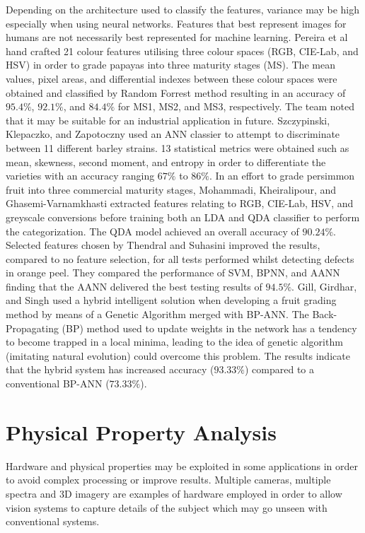 \documentclass[fleqn,twoside,12pt]{report}
\begin{document}
Depending on the architecture used to classify the features, variance may be high especially when using neural networks. Features that best represent images for humans are not necessarily best represented for machine learning. Pereira et al \cite{pereira} hand crafted 21 colour features utilising three colour spaces (RGB, CIE-Lab, and HSV) in order to grade papayas into three maturity stages (MS). The mean values, pixel areas, and differential indexes between these colour spaces were obtained and classified by Random Forrest method resulting in an accuracy of $95.4\%$, $92.1\%$, and $84.4\%$ for MS1, MS2, and MS3, respectively. The team noted that it may be suitable for an industrial application in future. Szczypinski, Klepaczko, and Zapotoczny \cite{szczypinski} used an ANN classier to attempt to discriminate between 11 different barley strains. 13 statistical metrics were obtained such as mean, skewness, second moment, and entropy in order to differentiate the varieties with an accuracy ranging $67\%$ to $86\%$. In an effort to grade persimmon fruit into three commercial maturity stages, Mohammadi, Kheiralipour, and Ghasemi-Varnamkhasti \cite{mohammadi} extracted features relating to RGB, CIE-Lab, HSV, and greyscale conversions before training both an LDA and QDA classifier to perform the categorization. The QDA model achieved an overall accuracy of $90.24\%$. Selected features chosen by Thendral and Suhasini \cite{thendral} improved the results, compared to no feature selection, for all tests performed whilst detecting defects in orange peel. They compared the performance of SVM, BPNN, and AANN finding that the AANN delivered the best testing results of $94.5\%$. Gill, Girdhar, and Singh \cite{gill} used a hybrid intelligent solution when developing a fruit grading method by means of a Genetic Algorithm merged with BP-ANN. The Back-Propagating (BP) method used to update weights in the network has a tendency to become trapped in a local minima, leading to the idea of genetic algorithm (imitating natural evolution) could overcome this problem. The results indicate that the hybrid system has increased accuracy ($93.33\%$) compared to a conventional BP-ANN ($73.33\%$).  



\section{Physical Property Analysis}

Hardware and physical properties may be exploited in some applications in order to avoid complex processing or improve results. Multiple cameras, multiple spectra and 3D imagery are examples of hardware employed in order to allow vision systems to capture details of the subject which may go unseen with conventional systems. 
\end{document}
